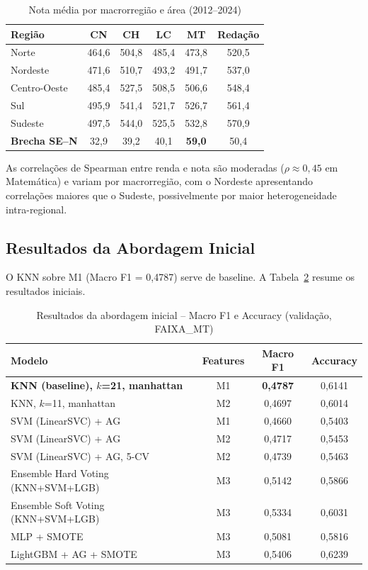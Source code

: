 \documentclass[12pt]{article}
\begin{document}
\begin{table}[H]
\centering
\caption{Nota média por macrorregião e área (2012--2024)}
\label{tab:medias}
\small
\begin{tabular}{lccccc}
\toprule
\textbf{Região} & \textbf{CN} & \textbf{CH} & \textbf{LC} & \textbf{MT} & \textbf{Redação} \\
\midrule
Norte        & 464,6 & 504,8 & 485,4 & 473,8 & 520,5 \\
Nordeste     & 471,6 & 510,7 & 493,2 & 491,7 & 537,0 \\
Centro-Oeste & 485,4 & 527,5 & 508,5 & 506,6 & 548,4 \\
Sul          & 495,9 & 541,4 & 521,7 & 526,7 & 561,4 \\
Sudeste      & 497,5 & 544,0 & 525,5 & 532,8 & 570,9 \\
\midrule
\textbf{Brecha SE--N} & 32,9 & 39,2 & 40,1 & \textbf{59,0} & 50,4 \\
\bottomrule
\end{tabular}
\end{table}

As correlações de Spearman entre renda e nota são moderadas
($\rho \approx 0,45$ em Matemática) e variam por macrorregião, com o
Nordeste apresentando correlações maiores que o Sudeste, possivelmente
por maior heterogeneidade intra-regional.

\subsection{Resultados da Abordagem Inicial}

O KNN sobre M1 (Macro F1 = 0,4787) serve de baseline. A
Tabela~\ref{tab:resultados_inicial} resume os resultados iniciais.

\begin{table}[H]
\centering
\caption{Resultados da abordagem inicial -- Macro F1 e Accuracy (validação, FAIXA\_MT)}
\label{tab:resultados_inicial}
\small
\begin{tabular}{lccc}
\toprule
\textbf{Modelo} & \textbf{Features} & \textbf{Macro F1} & \textbf{Accuracy} \\
\midrule
\textbf{KNN (baseline), $k$=21, manhattan} & M1 & \textbf{0,4787} & 0,6141 \\
KNN, $k$=11, manhattan                     & M2 & 0,4697 & 0,6014 \\
SVM (LinearSVC) + AG                       & M1 & 0,4660 & 0,5403 \\
SVM (LinearSVC) + AG                       & M2 & 0,4717 & 0,5453 \\
SVM (LinearSVC) + AG, 5-CV                 & M2 & 0,4739 & 0,5463 \\
Ensemble Hard Voting (KNN+SVM+LGB)         & M3 & 0,5142 & 0,5866 \\
Ensemble Soft Voting (KNN+SVM+LGB)         & M3 & 0,5334 & 0,6031 \\
MLP + SMOTE                                & M3 & 0,5081 & 0,5816 \\
LightGBM + AG + SMOTE                      & M3 & 0,5406 & 0,6239 \\
\bottomrule
\end{tabular}
\end{table}
\end{document}
